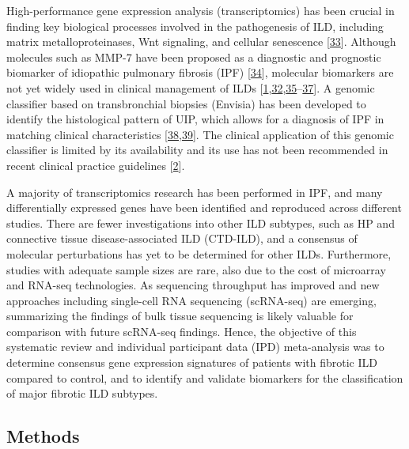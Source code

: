 \documentclass[
]{article}
\begin{document}
High-performance gene expression analysis (transcriptomics) has been crucial in finding key biological processes involved in the pathogenesis of ILD, including matrix metalloproteinases, Wnt signaling, and cellular senescence {[}\protect\hyperlink{ref-vukmirovic_impact_2018}{33}{]}. Although molecules such as MMP-7 have been proposed as a diagnostic and prognostic biomarker of idiopathic pulmonary fibrosis (IPF) {[}\protect\hyperlink{ref-khan_systematic_2022}{34}{]}, molecular biomarkers are not yet widely used in clinical management of ILDs {[}\protect\hyperlink{ref-raghu_diagnosis_2018}{1},\protect\hyperlink{ref-morais_serum_2015}{32},\protect\hyperlink{ref-white_plasma_2016}{35}--\protect\hyperlink{ref-johannson_treatment_2021}{37}{]}. A genomic classifier based on transbronchial biopsies (Envisia) has been developed to identify the histological pattern of UIP, which allows for a diagnosis of IPF in matching clinical characteristics {[}\protect\hyperlink{ref-pankratz_usual_2017}{38},\protect\hyperlink{ref-choi_analytical_2017}{39}{]}. The clinical application of this genomic classifier is limited by its availability and its use has not been recommended in recent clinical practice guidelines {[}\protect\hyperlink{ref-raghu_idiopathic_2022}{2}{]}.

A majority of transcriptomics research has been performed in IPF, and many differentially expressed genes have been identified and reproduced across different studies. There are fewer investigations into other ILD subtypes, such as HP and connective tissue disease-associated ILD (CTD-ILD), and a consensus of molecular perturbations has yet to be determined for other ILDs. Furthermore, studies with adequate sample sizes are rare, also due to the cost of microarray and RNA-seq technologies. As sequencing throughput has improved and new approaches including single-cell RNA sequencing (scRNA-seq) are emerging, summarizing the findings of bulk tissue sequencing is likely valuable for comparison with future scRNA-seq findings. Hence, the objective of this systematic review and individual participant data (IPD) meta-analysis was to determine consensus gene expression signatures of patients with fibrotic ILD compared to control, and to identify and validate biomarkers for the classification of major fibrotic ILD subtypes.

\hypertarget{methods}{%
\subsection{Methods}\label{methods}}
\end{document}

